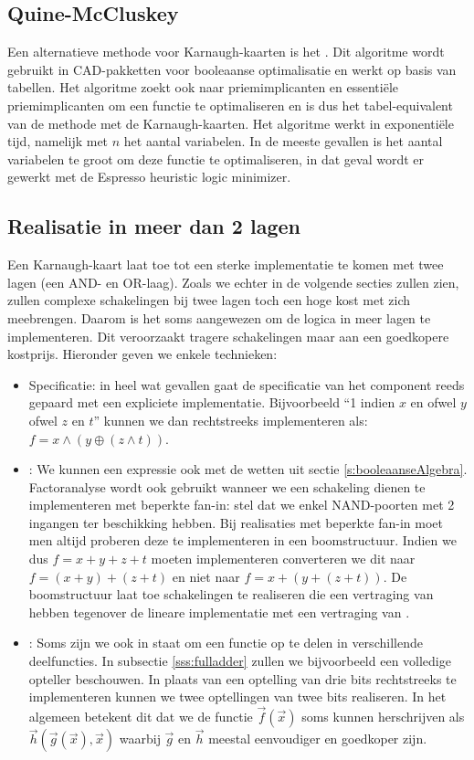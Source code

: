 \subsection{Quine-McCluskey}
Een alternatieve methode voor Karnaugh-kaarten is het . Dit algoritme wordt gebruikt in CAD-pakketten voor booleaanse optimalisatie en werkt op basis van tabellen. Het algoritme zoekt ook naar priemimplicanten en essenti\"ele priemimplicanten om een functie te optimaliseren en is dus het tabel-equivalent van de methode met de Karnaugh-kaarten. Het algoritme werkt in exponenti\"ele tijd, namelijk  met $n$ het aantal variabelen. In de meeste gevallen is het aantal variabelen te groot om deze functie te optimaliseren, in dat geval wordt er gewerkt met de Espresso heuristic logic minimizer.
\subsection{Realisatie in meer dan 2 lagen}
Een Karnaugh-kaart laat toe tot een sterke implementatie te komen met twee lagen (een AND- en OR-laag). Zoals we echter in de volgende secties zullen zien, zullen complexe schakelingen bij twee lagen toch een hoge kost met zich meebrengen. Daarom is het soms aangewezen om de logica in meer lagen te implementeren. Dit veroorzaakt tragere schakelingen maar aan een goedkopere kostprijs. Hieronder geven we enkele technieken:
\begin{itemize}
 \item Specificatie: in heel wat gevallen gaat de specificatie van het component reeds gepaard met een expliciete implementatie. Bijvoorbeeld ``1 indien $x$ en ofwel $y$ ofwel $z$ en $t$'' kunnen we dan rechtstreeks implementeren als: $f=x\wedge\left(y\oplus\left(z\wedge t\right)\right)$.
 \item {}: We kunnen een expressie ook  met de wetten uit sectie \ref{s:booleaanseAlgebra}. Factoranalyse wordt ook gebruikt wanneer we een schakeling dienen te implementeren met beperkte fan-in: stel dat we enkel NAND-poorten met 2 ingangen ter beschikking hebben. Bij realisaties met beperkte fan-in moet men altijd proberen deze te implementeren in een boomstructuur. Indien we dus $f=x+y+z+t$ moeten implementeren converteren we dit naar $f=\left(x+y\right)+\left(z+t\right)$ en niet naar $f=x+\left(y+\left(z+t\right)\right)$. De boomstructuur laat toe schakelingen te realiseren die een vertraging van  hebben tegenover de lineare implementatie met een vertraging van .
 \item {}: Soms zijn we ook in staat om een functie op te delen in verschillende deelfuncties. In subsectie \ref{sss:fulladder} zullen we bijvoorbeeld een volledige opteller beschouwen. In plaats van een optelling van drie bits rechtstreeks te implementeren kunnen we twee optellingen van twee bits realiseren. In het algemeen betekent dit dat we de functie $\vec{f}\left(\vec{x}\right)$ soms kunnen herschrijven als $\vec{h}\left(\vec{g}\left(\vec{x}\right),\vec{x}\right)$ waarbij $\vec{g}$ en $\vec{h}$ meestal eenvoudiger en goedkoper zijn.
\end{itemize}
